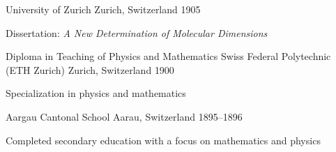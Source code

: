 
\begin{cventries}

    {University of Zurich} %
    {Zurich, Switzerland} %
    {1905} %
    {
      \begin{cvitems} %
        \item {Dissertation: \emph{A New Determination of Molecular Dimensions}}
      \end{cvitems}
    }
    

  \cventry
    {Diploma in Teaching of Physics and Mathematics} %
    {Swiss Federal Polytechnic (ETH Zurich)} %
    {Zurich, Switzerland} %
    {1900} %
    {
      \begin{cvitems} %
        \item {Specialization in physics and mathematics}
      \end{cvitems}
    }
    

    {Aargau Cantonal School} %
    {Aarau, Switzerland} %
    {1895--1896} %
    {
      \begin{cvitems} %
        \item {Completed secondary education with a focus on mathematics and 
        physics}
      \end{cvitems}
    }

\end{cventries}
